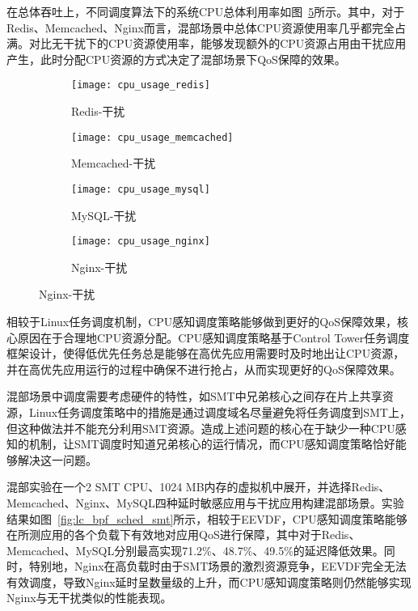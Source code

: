 在总体吞吐上，不同调度算法下的系统CPU总体利用率如图~\ref{fig:cpu_usage}所示。其中，对于Redis、Memcached、Nginx而言，混部场景中总体CPU资源使用率几乎都完全占满。对比无干扰下的CPU资源使用率，能够发现额外的CPU资源占用由干扰应用产生，此时分配CPU资源的方式决定了混部场景下QoS保障的效果。

\begin{figure}[H]
    \centering
    \begin{subfigure}[b]{0.33\textwidth}
        \texttt{[image: cpu\_usage\_redis]}
        \caption{Redis-干扰}
        \label{fig:cpu_usage_redis}
    \end{subfigure}
    \begin{subfigure}[b]{0.33\textwidth}
        \texttt{[image: cpu\_usage\_memcached]}
        \caption{Memcached-干扰}
        \label{fig:cpu_usage_memcached}
    \end{subfigure}
    \begin{subfigure}[b]{0.33\textwidth}
        \texttt{[image: cpu\_usage\_mysql]}
        \caption{MySQL-干扰}
        \label{fig:cpu_usage_mysql}
    \end{subfigure}
    \begin{subfigure}[b]{0.33\textwidth}
        \texttt{[image: cpu\_usage\_nginx]}
        \caption{Nginx-干扰}
        \label{fig:cpu_usage_nginx}
    \end{subfigure}
\label{fig:cpu_usage}
\end{figure}

相较于Linux任务调度机制，CPU感知调度策略能够做到更好的QoS保障效果，核心原因在于合理地CPU资源分配。CPU感知调度策略基于Control Tower任务调度框架设计，使得低优先任务总是能够在高优先应用需要时及时地出让CPU资源，并在高优先应用运行的过程中确保不进行抢占，从而实现更好的QoS保障效果。

混部场景中调度需要考虑硬件的特性，如SMT中兄弟核心之间存在片上共享资源，Linux任务调度策略中的措施是通过调度域名尽量避免将任务调度到SMT上，但这种做法并不能充分利用SMT资源。造成上述问题的核心在于缺少一种CPU感知的机制，让SMT调度时知道兄弟核心的运行情况，而CPU感知调度策略恰好能够解决这一问题。

混部实验在一个2 SMT CPU、1024 MB内存的虚拟机中展开，并选择Redis、Memcached、Nginx、MySQL四种延时敏感应用与干扰应用构建混部场景。实验结果如图~\ref{fig:lc_bpf_sched_smt}所示，相较于EEVDF，CPU感知调度策略能够在所测应用的各个负载下有效地对应用QoS进行保障，其中对于Redis、Memcached、MySQL分别最高实现71.2\%、48.7\%、49.5\%的延迟降低效果。同时，特别地，Nginx在高负载时由于SMT场景的激烈资源竞争，EEVDF完全无法有效调度，导致Nginx延时呈数量级的上升，而CPU感知调度策略则仍然能够实现Nginx与无干扰类似的性能表现。

